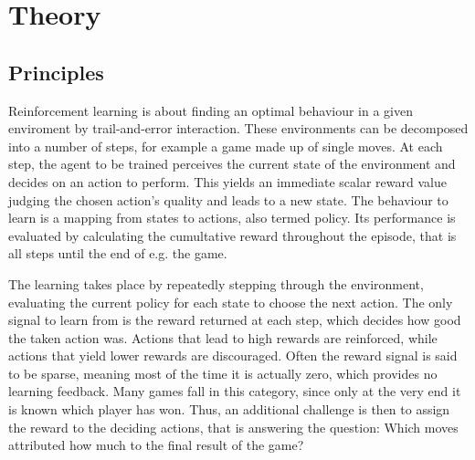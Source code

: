 \chapter{Theory}

\section{Principles}


Reinforcement learning is about finding an optimal behaviour in a given enviroment by
trail-and-error interaction.
These environments can be decomposed into a number of steps, for example a game made up of
single moves.
At each step, the agent to be trained perceives the current state of the environment and
decides on an action to perform.
This yields an immediate scalar reward value judging the chosen action's quality and leads
to a new state.
The behaviour to learn is a mapping from states to actions, also termed policy.
Its performance is evaluated by calculating the cumultative reward throughout the episode,
that is all steps until the end of e.g. the game.

The learning takes place by repeatedly stepping through the environment, evaluating the
current policy for each state to choose the next action.
The only signal to learn from is the reward returned at each step, which decides how good
the taken action was.
Actions that lead to high rewards are reinforced, while actions that yield lower rewards
are discouraged.
Often the reward signal is said to be sparse, meaning most of the time it is actually
zero, which provides no learning feedback.
Many games fall in this category, since only at the very end it is known which player has
won.
Thus, an additional challenge is then to assign the reward to the deciding actions, that
is answering the question:
Which moves attributed how much to the final result of the game?

